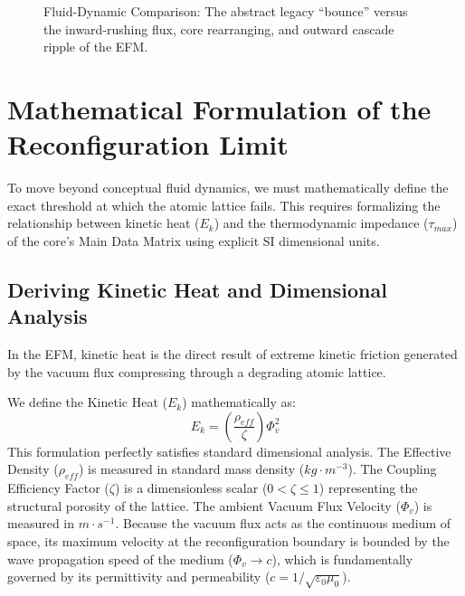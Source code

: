\documentclass[11pt, a4paper]{article}
\begin{document}
\begin{figure}[H]
    \caption{Fluid-Dynamic Comparison: The abstract legacy ``bounce'' versus the inward-rushing flux, core rearranging, and outward cascade ripple of the EFM.}
    \label{fig:cascade}
  \end{figure}

\section{Mathematical Formulation of the Reconfiguration Limit}
  To move beyond conceptual fluid dynamics, we must mathematically define the exact threshold at which the atomic lattice fails. This requires formalizing the relationship between kinetic heat ($E_k$) and the thermodynamic impedance ($\tau_{max}$) of the core's Main Data Matrix using explicit SI dimensional units.

  \subsection{Deriving Kinetic Heat and Dimensional Analysis}
  In the EFM, kinetic heat is the direct result of extreme kinetic friction generated by the vacuum flux compressing through a degrading atomic lattice. 
  
  We define the Kinetic Heat ($E_k$) mathematically as:
  \begin{equation}
    E_k = \left( \frac{\rho_{eff}}{\zeta} \right) \Phi_v^2
  \end{equation}
  This formulation perfectly satisfies standard dimensional analysis. The Effective Density ($\rho_{eff}$) is measured in standard mass density ($kg \cdot m^{-3}$). The Coupling Efficiency Factor ($\zeta$) is a dimensionless scalar ($0 < \zeta \le 1$) representing the structural porosity of the lattice. The ambient Vacuum Flux Velocity ($\Phi_v$) is measured in $m \cdot s^{-1}$. Because the vacuum flux acts as the continuous medium of space, its maximum velocity at the reconfiguration boundary is bounded by the wave propagation speed of the medium ($\Phi_v \to c$), which is fundamentally governed by its permittivity and permeability ($c = 1/\sqrt{\varepsilon_0 \mu_0}$). 
  
\end{document}
